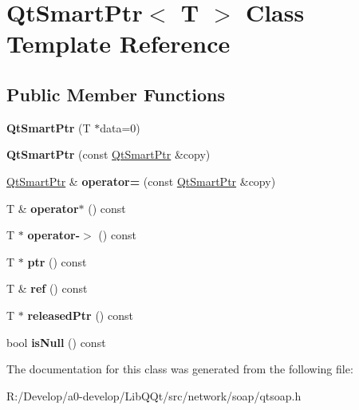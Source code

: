\hypertarget{class_qt_smart_ptr}{}\section{Qt\+Smart\+Ptr$<$ T $>$ Class Template Reference}
\label{class_qt_smart_ptr}
\subsection*{Public Member Functions}
\begin{DoxyCompactItemize}
\item 
\mbox{\label{class_qt_smart_ptr_a8cd509521855a6099e4cb96b81ffc3ed}} 
{\bfseries Qt\+Smart\+Ptr} (T $\ast$data=0)
\item 
\mbox{\label{class_qt_smart_ptr_ac24cdc8b05edbb0a32795a13495fd0ef}} 
{\bfseries Qt\+Smart\+Ptr} (const \mbox{\hyperlink{class_qt_smart_ptr}{Qt\+Smart\+Ptr}} \&copy)
\item 
\mbox{\label{class_qt_smart_ptr_a381c70a5f1fdb7e24124fba071ec4579}} 
\mbox{\hyperlink{class_qt_smart_ptr}{Qt\+Smart\+Ptr}} \& {\bfseries operator=} (const \mbox{\hyperlink{class_qt_smart_ptr}{Qt\+Smart\+Ptr}} \&copy)
\item 
\mbox{\label{class_qt_smart_ptr_a041076c7faec27486822ae9dea27d7b7}} 
T \& {\bfseries operator$\ast$} () const
\item 
\mbox{\label{class_qt_smart_ptr_a81283d0a0d97a1034d5bb203d34109ab}} 
T $\ast$ {\bfseries operator-\/$>$} () const
\item 
\mbox{\label{class_qt_smart_ptr_a3c9bbe26f9124ca2ff1ca6cee9232c8e}} 
T $\ast$ {\bfseries ptr} () const
\item 
\mbox{\label{class_qt_smart_ptr_a041a4b83f17732bd2ca318b705ef910f}} 
T \& {\bfseries ref} () const
\item 
\mbox{\label{class_qt_smart_ptr_a782e930929d961176c9ca71d169758ac}} 
T $\ast$ {\bfseries released\+Ptr} () const
\item 
\mbox{\label{class_qt_smart_ptr_abd91d3ed661348af24da34a811964152}} 
bool {\bfseries is\+Null} () const
\end{DoxyCompactItemize}


The documentation for this class was generated from the following file\+:\begin{DoxyCompactItemize}
\item 
R\+:/\+Develop/a0-\/develop/\+Lib\+Q\+Qt/src/network/soap/qtsoap.\+h\end{DoxyCompactItemize}
